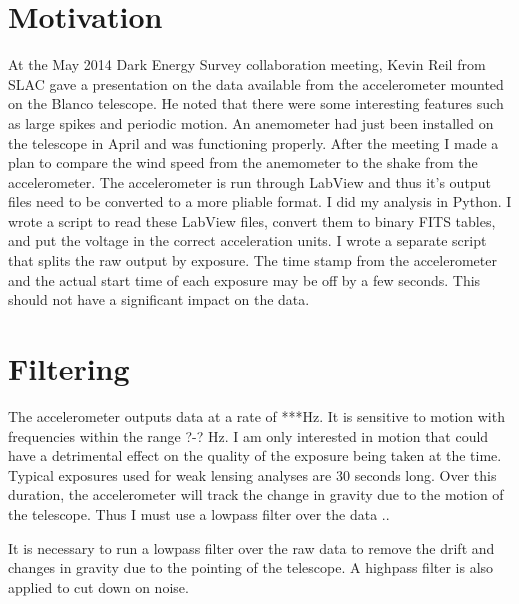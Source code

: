 \documentclass{article}
\begin{document}
\section{Motivation}
At the May 2014 Dark Energy Survey collaboration meeting, Kevin Reil from SLAC gave a presentation on the data available from the accelerometer mounted on the Blanco telescope. He noted that there were some interesting features such as large spikes and periodic motion. An anemometer had just been installed on the telescope in April and was functioning properly. After the meeting I made a plan to compare the wind speed from the anemometer to the shake from the accelerometer. 
	The accelerometer is run through LabView and thus it's output files need to be converted to a more pliable format. I did my analysis in Python. I wrote a script to read these LabView files, convert them to binary FITS tables, and put the voltage in the correct acceleration units. I wrote a separate script that splits the raw output by exposure. The time stamp from the accelerometer and the actual start time of each exposure may be off by a few seconds. This should not have a significant impact on the data. 
	
\section{Filtering}
	The accelerometer outputs data at a rate of ***Hz. It is sensitive to motion with frequencies within the range ?-? Hz. I am only interested in motion that could have a detrimental effect on the quality of the exposure being taken at the time. Typical exposures used for weak lensing analyses are 30 seconds long. Over this duration, the accelerometer will track the change in gravity due to the motion of the telescope. Thus I must use a lowpass filter over the data ..

	It is necessary to run a lowpass filter over the raw data to remove the drift and changes in gravity due to the pointing of the telescope. A highpass filter is also applied to cut down on noise. 
\end{document}
